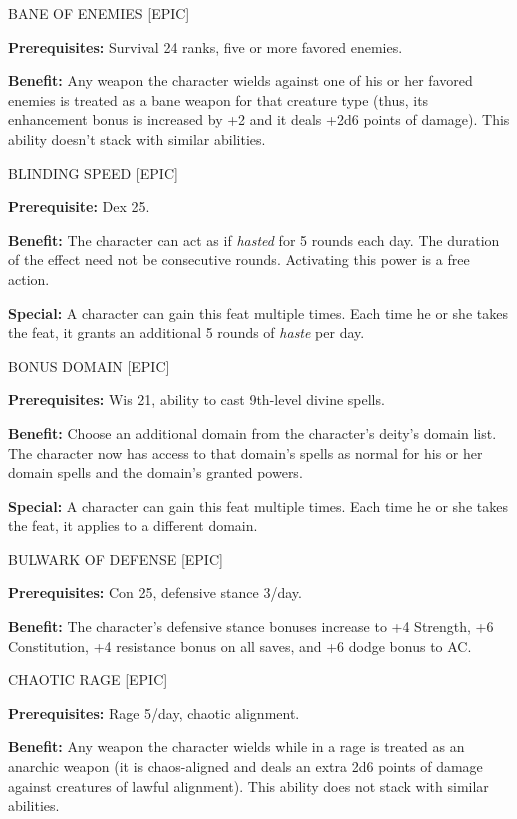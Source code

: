 \documentclass{article}
\begin{document}
\vspace{12pt}
BANE OF ENEMIES [EPIC] 

\textbf{Prerequisites:} Survival 24 ranks, five or more favored enemies. 

\textbf{Benefit:} Any weapon the character wields against one of his or her favored 
enemies is treated as a bane weapon for that creature type (thus, its enhancement 
bonus is increased by +2 and it deals +2d6 points of damage). This ability doesn't 
stack with similar abilities. 

\vspace{12pt}
BLINDING SPEED [EPIC] 

\textbf{Prerequisite:} Dex 25. 

\textbf{Benefit:} The character can act as if \textit{hasted }for 5 rounds each 
day. The duration of the effect need not be consecutive rounds. Activating this 
power is a free action. 

\textbf{Special:} A character can gain this feat multiple times. Each time he or 
she takes the feat, it grants an additional 5 rounds of \textit{haste }per day. 

\vspace{12pt}
BONUS DOMAIN [EPIC] 

\textbf{Prerequisites:} Wis 21, ability to cast 9th-level divine spells. 

\textbf{Benefit:} Choose an additional domain from the character's deity's domain 
list. The character now has access to that domain's spells as normal for his or 
her domain spells and the domain's granted powers. 

\textbf{Special:} A character can gain this feat multiple times. Each time he or 
she takes the feat, it applies to a different domain. 

\vspace{12pt}
BULWARK OF DEFENSE [EPIC] 

\textbf{Prerequisites:} Con 25, defensive stance 3/day. 

\textbf{Benefit:} The character's defensive stance bonuses increase to +4 Strength, 
+6 Constitution, +4 resistance bonus on all saves, and +6 dodge bonus to AC. 

\vspace{12pt}
CHAOTIC RAGE [EPIC] 

\textbf{Prerequisites:} Rage 5/day, chaotic alignment. 

\textbf{Benefit:} Any weapon the character wields while in a rage is treated as 
an anarchic weapon (it is chaos-aligned and deals an extra 2d6 points of damage 
against creatures of lawful alignment). This ability does not stack with similar 
abilities. 
\end{document}

